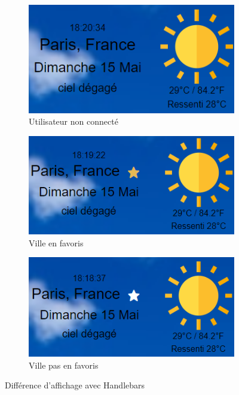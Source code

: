 \documentclass[12pt, french]{article}
\begin{document}
		\begin{figure}[htbp]
    		\begin{subfigure}{.33\textwidth}
		        \centering
                \includegraphics[width=.82\linewidth]{images/user_non_connecte.PNG}
                \caption{Utilisateur non connecté}
                \label{fig:user_non_connecte}      
    		\end{subfigure}
            \begin{subfigure}{.33\textwidth}
                \centering
                \includegraphics[width=.9\linewidth]{images/user_connecte_fav.PNG}
                \caption{Ville en favoris}
                \label{fig:user_connecte_fav}   
            \end{subfigure}
            \begin{subfigure}{.33\textwidth}
                \centering
                \includegraphics[width=.9\linewidth]{images/user_connecte_non_fav.PNG}
                \caption{Ville pas en favoris}
                \label{fig:user_connecte_non_fav}
            \end{subfigure}
            \caption{Différence d'affichage avec Handlebars}
        \end{figure}
        
\end{document}
